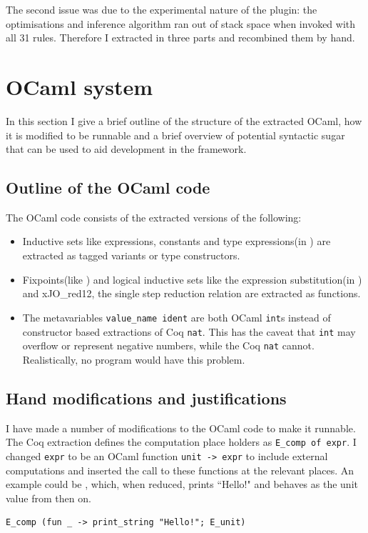 \documentclass[12pt,twoside,notitlepage]{report}
\theoremstyle{plain}%
\theoremstyle{definition}
\theoremstyle{remark}
\begin{document}
The second issue was due to the experimental nature of the plugin: the optimisations and inference algorithm ran out of stack space when invoked with all 31 rules. Therefore I extracted in three parts and recombined them by hand.

\section{OCaml system}
In this section I give a brief outline of the structure of the extracted OCaml, how it is modified to be runnable and a brief overview of potential syntactic sugar that can be used to aid development in the framework. 

\subsection{Outline of the OCaml code}
The OCaml code consists of the extracted versions of the following:
\begin{itemize}
\item{Inductive sets like expressions, constants and type expressions(in ) are extracted as tagged variants or type constructors.}
\item{Fixpoints(like ) and logical inductive sets like the expression substitution(in ) and xJO\_red12, the single step reduction relation are extracted as functions.}
\item{The metavariables \verb|value_name ident| are both OCaml \lstinline|int|s instead of constructor based extractions of Coq \lstinline[language={Coq}]|nat|. This has the caveat that \lstinline|int| may overflow or represent negative numbers, while the Coq \lstinline[language={Coq}]|nat| cannot. Realistically, no program would have this problem.}
\end{itemize}
\subsection{Hand modifications and justifications}
I have made a number of modifications to the OCaml code to make it runnable. The Coq extraction defines the computation place holders as \lstinline|E_comp of expr|. I changed \lstinline|expr| to be an OCaml function \lstinline|unit -> expr| to include external computations and inserted the call to these functions at the relevant places. An example could be , which, when reduced, prints ``Hello!" and behaves as the unit value from then on. 
\begin{lstlisting}[caption={OCaml computation placeholder example}, label={lst:ocaml_comp_place2}]
E_comp (fun _ -> print_string "Hello!"; E_unit)
\end{lstlisting}
\end{document}
